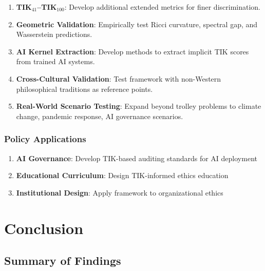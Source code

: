 \documentclass[11pt,a4paper]{article}
\theoremstyle{definition}
\theoremstyle{remark}
\begin{document}
\begin{enumerate}
    \item \textbf{TIK$_{41}$--TIK$_{100}$}: Develop additional extended metrics for finer discrimination.
    
    \item \textbf{Geometric Validation}: Empirically test Ricci curvature, spectral gap, and Wasserstein predictions.
    
    \item \textbf{AI Kernel Extraction}: Develop methods to extract implicit TIK scores from trained AI systems.
    
    \item \textbf{Cross-Cultural Validation}: Test framework with non-Western philosophical traditions as reference points.
    
    \item \textbf{Real-World Scenario Testing}: Expand beyond trolley problems to climate change, pandemic response, AI governance scenarios.
\end{enumerate}

\subsubsection{Policy Applications}

\begin{enumerate}
    \item \textbf{AI Governance}: Develop TIK-based auditing standards for AI deployment
    \item \textbf{Educational Curriculum}: Design TIK-informed ethics education
    \item \textbf{Institutional Design}: Apply framework to organizational ethics
\end{enumerate}

\newpage

\section{Conclusion}

\subsection{Summary of Findings}
\end{document}
